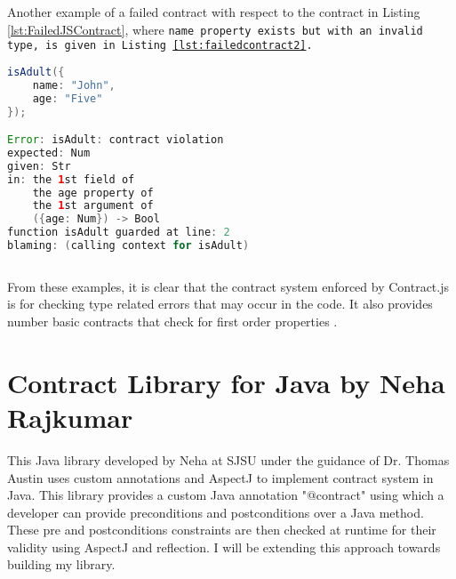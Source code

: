 Another example of a failed contract with respect to the contract in Listing \ref{lst:FailedJSContract}, where \tt{name} property exists but with an invalid type, is given in Listing \ref{lst:failedcontract2}. \linebreak

\begin{minipage}{\linewidth}
\begin{lstlisting}[frame=single, language=Java, caption={Example of a failed contract}, label={lst:failedcontract2}, captionpos=b, breaklines=true]
isAdult({
    name: "John",
    age: "Five"
});

Error: isAdult: contract violation
expected: Num
given: Str
in: the 1st field of
    the age property of
    the 1st argument of
    ({age: Num}) -> Bool
function isAdult guarded at line: 2
blaming: (calling context for isAdult)
   
\end{lstlisting}
\end{minipage}

From these examples, it is clear that the contract system enforced by Contract.js is for checking type related errors that may occur in the code. It also provides number basic contracts that check for first order properties \cite{Contract11:online}.    


\section{Contract Library for Java by Neha Rajkumar}
This Java library \cite{rajkumar2015designing} developed by Neha at SJSU under the guidance of Dr. Thomas Austin uses custom annotations and AspectJ to implement contract system in Java. This library provides a custom Java annotation "@contract" using which a developer can provide preconditions and postconditions over a Java method. These pre and postconditions constraints are then checked at runtime for their validity using AspectJ and reflection. I will be extending this approach towards building my library.   	     